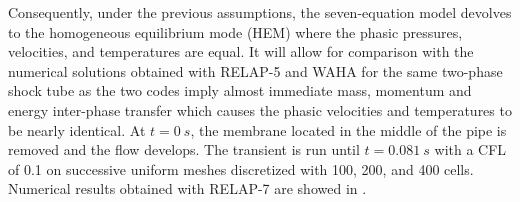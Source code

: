 \documentclass{inputs/mc2015}
\begin{document}
  Consequently, under the previous assumptions, the seven-equation model devolves to the homogeneous equilibrium mode (HEM) where the phasic pressures, velocities, and temperatures are equal. It will allow for comparison with the numerical solutions obtained with RELAP-5 \cite{Sokolowski-Koszela} and WAHA \cite{waha-manual} for the same two-phase shock tube as the two codes imply almost immediate mass, momentum and energy inter-phase transfer which causes the phasic velocities and temperatures to be nearly identical. 
 
At $t = 0\ s$, the membrane located in the middle of the pipe is removed and the flow develops. The transient is run until $t = 0.081\ s$ with a CFL of 0.1 on successive uniform meshes discretized with 100, 200, and 400 cells. Numerical results obtained with RELAP-7 are showed in .
\end{document}
